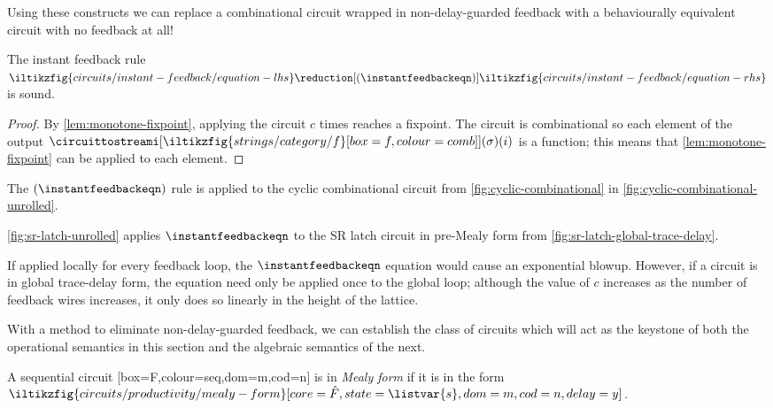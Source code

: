 Using these constructs we can replace a combinational circuit wrapped in
non-delay-guarded feedback with a behaviourally equivalent circuit with no
feedback at all!

\begin{proposition}\label{prop:instant-feedback}
    The instant feedback rule \(
    \iltikzfig{circuits/instant-feedback/equation-lhs}
    \reduction[(\instantfeedbackeqn)]
    \iltikzfig{circuits/instant-feedback/equation-rhs}
    \) is sound.
\end{proposition}
\begin{proof}
    By \cref{lem:monotone-fixpoint}, applying the circuit \(c\)
    times reaches a fixpoint.
    The circuit is combinational so each element of the output
    \(\circuittostreami[
        \iltikzfig{strings/category/f}[box=f,colour=comb]
    ](\sigma)(i)\) is a function; this means that \cref{lem:monotone-fixpoint}
    can be applied to each element.
\end{proof}

\begin{example}
    The \((\instantfeedbackeqn)\) rule is applied to the cyclic combinational
    circuit from \cref{fig:cyclic-combinational} in
    \cref{fig:cyclic-combinational-unrolled}.
\end{example}



\begin{example}
    \cref{fig:sr-latch-unrolled} applies \(\instantfeedbackeqn\) to the
    SR latch circuit in pre-Mealy form from
    \cref{fig:sr-latch-global-trace-delay}.
\end{example}



If applied locally for every feedback loop, the \(\instantfeedbackeqn\)
equation would cause an exponential blowup.
However, if a circuit is in global trace-delay form, the equation need only be
applied once to the global loop; although the value of \(c\) increases as the
number of feedback wires increases, it only does so linearly in the height of
the lattice.

With a method to eliminate non-delay-guarded feedback, we can establish the
class of circuits which will act as the keystone of both the operational
semantics in this section and the algebraic semantics of the next.

\begin{definition}\label{def:delay-guarded}
    A sequential circuit
    [box=F,colour=seq,dom=m,cod=n]
    is in \emph{Mealy form} if it is in the form \(
    \iltikzfig{circuits/productivity/mealy-form}[core=\hat{F},state=\listvar{s},dom=m,cod=n,delay=y]
    \).
\end{definition}

